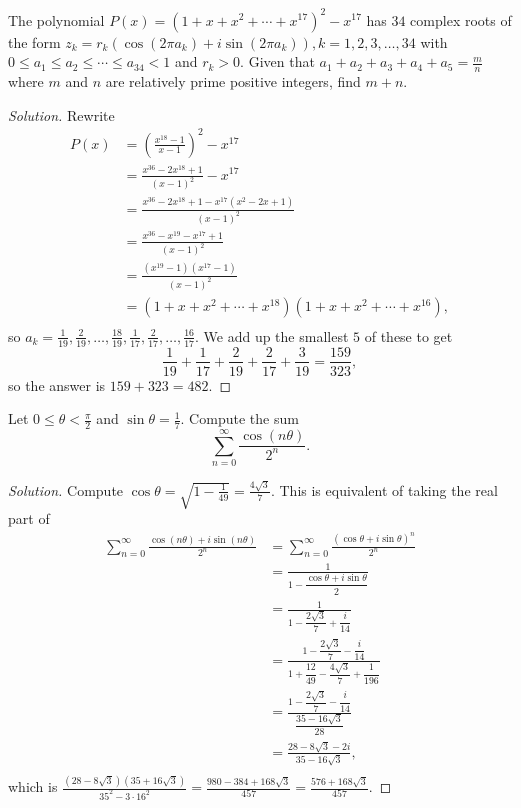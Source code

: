 \begin{prb}[2004 AIME I-13]
The polynomial $P(x) = (1 + x + x^2 + \cdots + x^{17})^2 - x^{17}$ has $34$
complex roots of the form $z_k = r_k \left( \cos (2 \pi a_k) + i \sin (2 \pi
a_k) \right), k = 1, 2, 3, \dots, 34$ with $0 \leq a_1 \leq a_2 \leq \cdots \leq
a_{34} < 1$ and $r_k > 0$. Given that $a_1 + a_2 + a_3 + a_4 + a_5 =
\frac{m}{n}$ where $m$ and $n$ are relatively prime positive integers, find $m +
n$.
\end{prb}

\ifsolutions
\begin{proof}[Solution]
Rewrite
\[ \begin{aligned}
P(x) &= \left( \frac{x^{18} - 1}{x - 1} \right)^2 - x^{17} \\
&= \frac{x^{36} - 2x^{18} + 1}{(x - 1)^2} - x^{17} \\
&= \frac{x^{36} - 2x^{18} + 1 - x^{17}(x^2 - 2x + 1)}{(x - 1)^2} \\
&= \frac{x^{36} - x^{19} - x^{17} + 1}{(x - 1)^2} \\
&= \frac{(x^{19} - 1) (x^{17} - 1)}{(x - 1)^2} \\
&= (1 + x + x^2 + \cdots + x^{18}) (1 + x + x^2 + \cdots + x^{16}), \\
\end{aligned} \]
so $a_k = \frac{1}{19}, \frac{2}{19}, \dots, \frac{18}{19}, \frac{1}{17},
\frac{2}{17}, \dots, \frac{16}{17}$. We add up the smallest $5$ of these to get
\[ \frac{1}{19} + \frac{1}{17} + \frac{2}{19} + \frac{2}{17} + \frac{3}{19} =
\frac{159}{323}, \]
so the answer is $159 + 323 = \boxed{482}$.
\end{proof}
\fi

\begin{prb}
Let $0 \leq \theta < \frac{\pi}{2}$ and $\sin \theta = \frac{1}{7}$. Compute the
sum
\[ \sum_{n = 0}^{\infty} \frac{\cos (n\theta)}{2^n}. \]
\end{prb}

\ifsolutions
\begin{proof}[Solution]
Compute $\cos \theta = \sqrt{1 - \frac{1}{49}} = \frac{4 \sqrt{3}}{7}$. This is
equivalent of taking the real part of
\[ \begin{aligned}
\sum_{n = 0}^{\infty} \frac{\cos (n\theta) + i \sin (n\theta)}{2^n} &= \sum_{n =
0}^{\infty} \frac{(\cos \theta + i \sin \theta)^n}{2^n} \\
&= \frac{1}{1 - \dfrac{\cos \theta + i \sin \theta}{2}} \\
&= \frac{1}{1 - \dfrac{2 \sqrt{3}}{7} + \dfrac{i}{14}} \\
&= \frac{1 - \dfrac{2 \sqrt{3}}{7} - \dfrac{i}{14}}{1 + \dfrac{12}{49} -
\dfrac{4 \sqrt{3}}{7} + \dfrac{1}{196}} \\
&= \frac{1 - \dfrac{2 \sqrt{3}}{7} - \dfrac{i}{14}}{\dfrac{35 - 16
\sqrt{3}}{28}} \\
&= \frac{28 - 8 \sqrt{3} - 2i}{35 - 16 \sqrt{3}}, \\
\end{aligned} \]
which is $\frac{(28 - 8 \sqrt{3})(35 + 16 \sqrt{3})}{35^2 - 3 \cdot 16^2} =
\frac{980 - 384 + 168 \sqrt{3}}{457} = \boxed{\frac{576 + 168 \sqrt{3}}{457}}$.
\end{proof}
\fi

